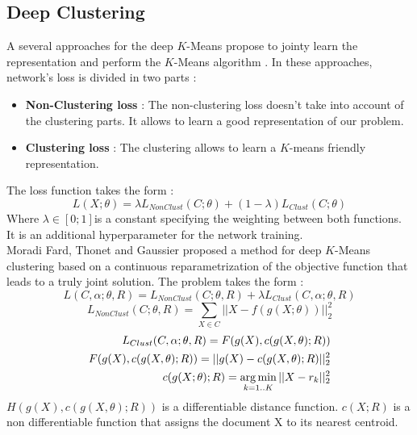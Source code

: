 \subsection{Deep Clustering}\label{seq:DeepClust}
A several approaches for the deep $K$-Means propose to jointy learn the
representation and perform the $K$-Means algorithm \cite{2018arXiv180107648A}.
In these approaches, network's loss is divided in two parts :
\begin{itemize}
\item \textbf{Non-Clustering loss} : The non-clustering loss doesn't
  take into account of the clustering parts. It allows to learn a good
  representation of our problem.
\item \textbf{Clustering loss} : The clustering allows to learn a
  $K$-means friendly representation.
\end{itemize}
The loss function takes the form :
\begin{equation}
L(X;\theta) = \lambda L_{NonClust}(C;\theta) + (1-\lambda)L_{Clust}(C; \theta)
\end{equation}
Where $\lambda \in [0 ; 1]$is a constant specifying the weighting between both 
functions.
It is an additional hyperparameter for the network training.\\
Moradi Fard, Thonet and Gaussier \cite{Deap-K-Means} proposed a method for deep $K$-Means 
clustering based on a continuous reparametrization of the objective function 
that leads to a truly joint solution. 
The problem takes the form : 
\begin{equation}
L(C ,\alpha;\theta,R) = L_{NonClust}(C;\theta,R ) + \lambda L_{Clust}(C,\alpha;\theta,R)
\end{equation}
\begin{equation}
L_{NonClust}(C;\theta,R ) = \sum_{X \in C} ||X - f(g(X;\theta))||_2^2
\end{equation}
\begin{equation}
\begin{aligned}
  L_{Clust}(C,\alpha;\theta,R) = F(g(X),c(g(X, \theta); R))\\
  F(g(X),c(g(X, \theta); R)) = ||g(X) - c(g(X, \theta); R) ||_2^2\\
  c(g(X; \theta); R) = \operatorname*{arg\,min}_{k = 1 .. K} || X - r_k||_2^2
\end{aligned}
\end{equation}
$H(g(X),c(g(X, \theta); R))$ is a differentiable distance function.
$c(X ; R)$ is a non differentiable function that assigns the document X
to its nearest centroid.\\
